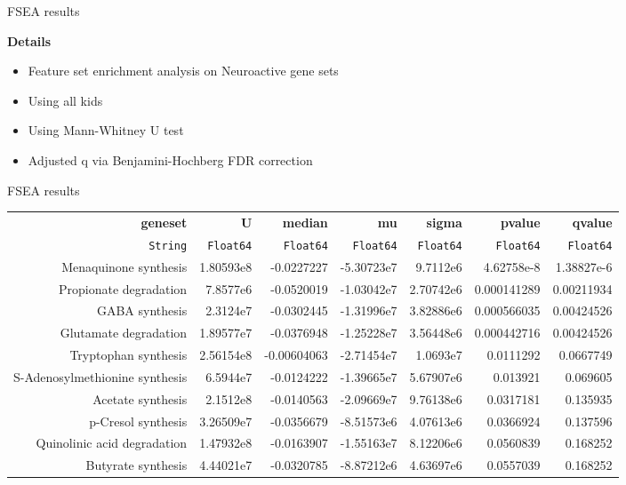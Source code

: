 \begin{frame}{FSEA results}

    \textbf{Details}
    \begin{itemize}
        \item Feature set enrichment analysis on Neuroactive gene sets
        \item Using all kids
        \item Using Mann-Whitney U test
        \item Adjusted q via Benjamini-Hochberg FDR correction
    \end{itemize}
\end{frame}

\begin{frame}{FSEA results}

    \begin{table}
        \tiny
            \begin{tabular}{rrrrrrr}
              \hline\hline
              \textbf{geneset} & \textbf{U} & \textbf{median} & \textbf{mu} & \textbf{sigma} & \textbf{pvalue} & \textbf{qvalue} \\
              \texttt{String} & \texttt{Float64} & \texttt{Float64} & \texttt{Float64} & \texttt{Float64} & \texttt{Float64} & \texttt{Float64} \\\hline
              Menaquinone synthesis & 1.80593e8 & -0.0227227 & -5.30723e7 & 9.7112e6 & 4.62758e-8 & 1.38827e-6 \\
              Propionate degradation & 7.8577e6 & -0.0520019 & -1.03042e7 & 2.70742e6 & 0.000141289 & 0.00211934 \\
              GABA synthesis & 2.3124e7 & -0.0302445 & -1.31996e7 & 3.82886e6 & 0.000566035 & 0.00424526 \\
              Glutamate degradation & 1.89577e7 & -0.0376948 & -1.25228e7 & 3.56448e6 & 0.000442716 & 0.00424526 \\
              Tryptophan synthesis & 2.56154e8 & -0.00604063 & -2.71454e7 & 1.0693e7 & 0.0111292 & 0.0667749 \\
              S-Adenosylmethionine synthesis & 6.5944e7 & -0.0124222 & -1.39665e7 & 5.67907e6 & 0.013921 & 0.069605 \\
              Acetate synthesis & 2.1512e8 & -0.0140563 & -2.09669e7 & 9.76138e6 & 0.0317181 & 0.135935 \\
              p-Cresol synthesis & 3.26509e7 & -0.0356679 & -8.51573e6 & 4.07613e6 & 0.0366924 & 0.137596 \\
              Quinolinic acid degradation & 1.47932e8 & -0.0163907 & -1.55163e7 & 8.12206e6 & 0.0560839 & 0.168252 \\
              Butyrate synthesis & 4.44021e7 & -0.0320785 & -8.87212e6 & 4.63697e6 & 0.0557039 & 0.168252 \\\hline\hline
            \end{tabular}
          \end{table}

\end{frame} 

